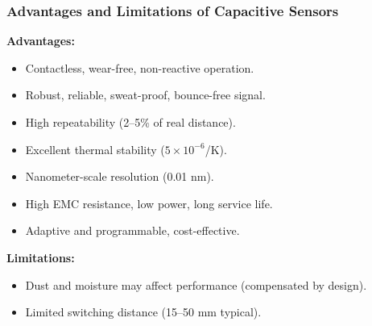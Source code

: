\begin{frame}
	\frametitle{Advantages and Limitations of Capacitive Sensors}
    \small
    \textbf{Advantages:}
    \begin{itemize}
        \item Contactless, wear-free, non-reactive operation.
        \item Robust, reliable, sweat-proof, bounce-free signal.
        \item High repeatability (2–5\% of real distance).
        \item Excellent thermal stability ($5\times10^{-6}$/K).
        \item Nanometer-scale resolution (0.01 nm).
        \item High EMC resistance, low power, long service life.
        \item Adaptive and programmable, cost-effective.
    \end{itemize}
    \textbf{Limitations:}
    \begin{itemize}
        \item Dust and moisture may affect performance (compensated by design).
        \item Limited switching distance (15–50 mm typical).
    \end{itemize}
\end{frame}

